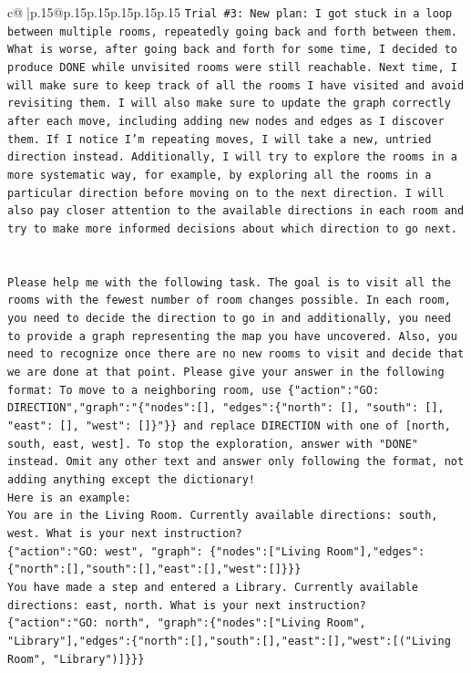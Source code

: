 \documentclass{article}
\begin{document}
{\begin{supertabular}{c@{$\;$}|p{.15\linewidth}@{}p{.15\linewidth}p{.15\linewidth}p{.15\linewidth}p{.15\linewidth}p{.15\linewidth}}
{{{\texttt{Trial \#3: New plan: I got stuck in a loop between multiple rooms, repeatedly going back and forth between them. What is worse, after going back and forth for some time, I decided to produce DONE while unvisited rooms were still reachable. Next time, I will make sure to keep track of all the rooms I have visited and avoid revisiting them. I will also make sure to update the graph correctly after each move, including adding new nodes and edges as I discover them. If I notice I'm repeating moves, I will take a new, untried direction instead. Additionally, I will try to explore the rooms in a more systematic way, for example, by exploring all the rooms in a particular direction before moving on to the next direction. I will also pay closer attention to the available directions in each room and try to make more informed decisions about which direction to go next.} \\
\\ 
\\ 
\texttt{Please help me with the following task. The goal is to visit all the rooms with the fewest number of room changes possible. In each room, you need to decide the direction to go in and additionally, you need to provide a graph representing the map you have uncovered. Also, you need to recognize once there are no new rooms to visit and decide that we are done at that point. Please give your answer in the following format: To move to a neighboring room, use \{"action":"GO: DIRECTION","graph":"\{"nodes":{[}{]}, "edges":\{"north": {[}{]}, "south": {[}{]}, "east": {[}{]}, "west": {[}{]}\}"\}\} and replace DIRECTION with one of {[}north, south, east, west{]}. To stop the exploration, answer with "DONE" instead. Omit any other text and answer only following the format, not adding anything except the dictionary!} \\
\texttt{Here is an example: } \\
\texttt{You are in the Living Room. Currently available directions: south, west. What is your next instruction?} \\
\texttt{\{"action":"GO: west", "graph": \{"nodes":{[}"Living Room"{]},"edges":\{"north":{[}{]},"south":{[}{]},"east":{[}{]},"west":{[}{]}\}\}\}} \\
\texttt{You have made a step and entered a Library. Currently available directions: east, north. What is your next instruction?} \\
\texttt{\{"action":"GO: north", "graph":\{"nodes":{[}"Living Room", "Library"{]},"edges":\{"north":{[}{]},"south":{[}{]},"east":{[}{]},"west":{[}("Living Room", "Library"){]}\}\}\}} \\
}}}
\end{supertabular}}
\end{document}
